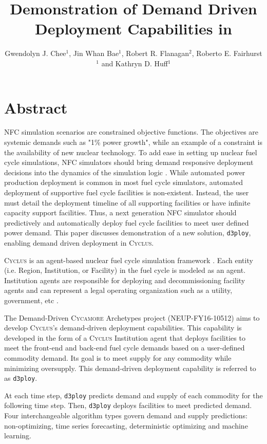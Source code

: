 \documentclass{anstrans}
\title{Demonstration of Demand Driven Deployment Capabilities in \Cyclus}
\author{Gwendolyn J. Chee$^1$, Jin Whan Bae$^1$, Robert R. Flanagan$^2$, Roberto E. Fairhurst$^1$ and Kathryn D. Huff$^1$}
\institute{
$^1$Dept. of Nuclear, Plasma and Radiological Engineering, University of Illinois at Urbana-Champaign \\
$^2$Nuclear Engineering Program, University of South Carolina \\

gchee2@illinois.edu
}
\newcommand{\Cyclus}{\textsc{Cyclus}\xspace}%
\newcommand{\Cycamore}{\textsc{Cycamore}\xspace}%
\begin{document}
\section{Abstract}
\gls{NFC} simulation scenarios are constrained objective functions. 
The objectives are systemic demands such as "1\% power growth", while an 
example of a constraint is the availability of new nuclear technology. 
To add ease in setting up nuclear fuel cycle simulations, \gls{NFC} simulators 
should bring demand responsive deployment decisions into the dynamics of the 
simulation logic \cite{huff_current_2017}. 
While automated power production deployment is common in most fuel cycle 
simulators, automated deployment of supportive fuel cycle 
facilities is non-existent. 
Instead, the user must detail the deployment timeline of all supporting 
facilities or have infinite capacity support facilities. 
Thus, a next generation \gls{NFC} simulator should predictively and 
automatically deploy fuel cycle facilities to meet user defined power demand. 
This paper discusses demonstration of a new solution, \texttt{d3ploy}, enabling 
demand driven deployment in \Cyclus. 

\Cyclus is an agent-based nuclear fuel cycle simulation framework 
\cite{huff_fundamental_2016}. 
Each entity (i.e. Region, Institution, or Facility) in the fuel cycle is modeled 
as an agent. 
Institution agents
are responsible for deploying and decommissioning facility agents and
can represent a legal operating organization such as a 
utility, government, etc \cite{huff_fundamental_2016}. 

The Demand-Driven \Cycamore Archetypes project (NEUP-FY16-10512) aims to 
develop \Cyclus's demand-driven deployment capabilities. 
This capability is developed in the form of a \Cyclus Institution agent that 
deploys facilities to meet the front-end and back-end fuel cycle demands
based on a user-defined commodity demand. 
Its goal is to meet supply for any commodity while minimizing oversupply.
This demand-driven deployment capability is referred to as \texttt{d3ploy}. 

At each time step, \texttt{d3ploy} predicts demand and supply of each 
commodity for the following time step.
Then, \texttt{d3ploy} deploys facilities to 
meet predicted demand. 
Four interchangeable algorithm types govern demand and supply predictions: 
non-optimizing, time series forecasting, deterministic optimizing and machine 
learning. 
\end{document}

